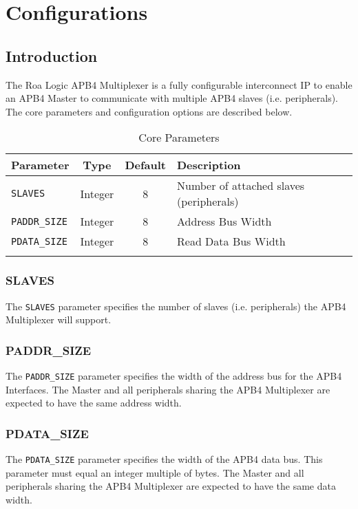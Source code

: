 \chapter{Configurations} \label{configurations}

\section{Introduction} \label{introduction-1}

The Roa Logic APB4 Multiplexer is a fully configurable interconnect IP to
enable an APB4 Master to communicate with multiple APB4 slaves (i.e.
peripherals). The core parameters and configuration options are
described below.

\begin{longtable}[]{@{}lccl@{}}
	\toprule
	  Parameter   & Type    & Default & Description\tabularnewline
	\midrule
	\endhead
	  \texttt{SLAVES}      & Integer & 8 & Number of attached slaves (peripherals)\tabularnewline
	  \texttt{PADDR\_SIZE} & Integer & 8 & Address Bus Width\tabularnewline
	  \texttt{PDATA\_SIZE} & Integer & 8 & Read Data Bus Width\tabularnewline
	\bottomrule
	\caption{Core Parameters}
\end{longtable}

\subsection{SLAVES} \label{slaves}

The \texttt{SLAVES} parameter specifies the number of slaves (i.e. peripherals)
the APB4 Multiplexer will support.

\subsection{PADDR\_SIZE} \label{paddr_size}

The \texttt{PADDR\_SIZE} parameter specifies the width of the address bus for the
APB4 Interfaces. The Master and all peripherals sharing the APB4
Multiplexer are expected to have the same address width.

\subsection{PDATA\_SIZE} \label{pdata_size}

The \texttt{PDATA\_SIZE} parameter specifies the width of the APB4 data bus. This
parameter must equal an integer multiple of bytes. The Master and all
peripherals sharing the APB4 Multiplexer are expected to have the same
data width.
